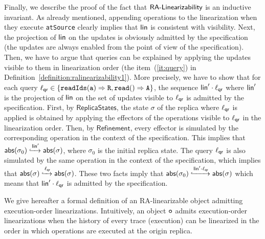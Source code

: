Finally, we describe the proof of the fact that $\mathsf{RA\text{-}Linearizability{}}$ is an inductive invariant. As already mentioned, appending operations to the linearization when they execute \lstinline|atSource| clearly implies that $\mathsf{lin}$ is consistent with visibility. Next, the projection of $\mathsf{lin}$ on the updates is obviously admitted by the specification (the updates are always enabled from the point of view of the specification).
Then, we have to argue that queries can be explained by applying the updates visible to them in linearization order (the item~(\ref{it:query}) in  Definition~\ref{definition:ralinearizability1}).
More precisely, we have to show that for each query $\alabel_{\mathsf{qr}}\in\{\alabellongind[{\tt readIds}]{a}{R}{},\alabellongind[{\tt read}]{}{A}{}\}$, the sequence $\mathsf{lin}'\cdot \ell_{\mathsf{qr}}$ where $\mathsf{lin}'$ is the projection of $\mathsf{lin}$ on the set of updates
visible to $\ell_{\mathsf{qr}}$ is admitted by the specification. First, by $\mathsf{ReplicaStates}$, the state $\sigma$ of the replica where $\ell_{\mathsf{qr}}$ is applied is obtained by applying the effectors of the operations visible to $\ell_{\mathsf{qr}}$ in the linearization order. Then, by $\mathsf{Refinement}$, every effector is simulated by the corresponding operation in the context of the specification. This implies that $\mathsf{abs}(\sigma_0)\xhookrightarrow{\ensuremath{\mathsf{lin}}'}\mathsf{abs}(\sigma)$, where $\sigma_0$ is the initial replica state. The query $\ell_{\mathsf{qr}}$ is also simulated by the same operation in the context of the specification, which implies that $\mathsf{abs}(\sigma)\xhookrightarrow{\ensuremath{\ell}_{\mathsf{qr}}}\mathsf{abs}(\sigma)$. These two facts imply that $\mathsf{abs}(\sigma_0)\xhookrightarrow{\ensuremath{\mathsf{lin}}'\cdot \ensuremath{\ell}_{\mathsf{qr}}}\mathsf{abs}(\sigma)$ which means that $\mathsf{lin}'\cdot \ell_{\mathsf{qr}}$ is admitted by the specification.

We give hereafter a formal definition of an RA-linearizable object admitting execution-order linearizations. Intuitively, an object $\mathtt{o}$ admits execution-order linearizations when the history of every trace (execution) can be linearized in the order in which operations are executed at the origin replica.

